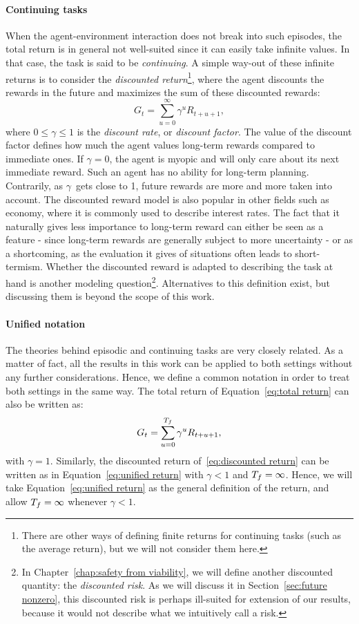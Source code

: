 				\paragraph{Continuing tasks} When the agent-environment interaction does not break into such episodes, the total return is in general not well-suited since it can easily take infinite values. In that case, the task is said to be\emph{ continuing}. A simple way-out of these infinite returns is to consider the\emph{ discounted return}\footnote{There are other ways of defining finite returns for continuing tasks (such as the average return), but we will not consider them here.}, where the agent discounts the rewards in the future and maximizes the sum of these discounted rewards:
				\begin{equation}
					G_t = \sum_{u=0}^\infty \gamma^u R_{t + u + 1}, \label{eq:discounted return}
				\end{equation}
				where $0 \leq \gamma \leq 1$ is the\emph{ discount rate}, or\emph{ discount factor}. The value of the discount factor defines how much the agent values long-term rewards compared to immediate ones. If $\gamma = 0$, the agent is myopic and will only care about its next immediate reward. Such an agent has no ability for long-term planning. Contrarily, as $\gamma$~gets close to 1, future rewards are more and more taken into account. The discounted reward model is also popular in other fields such as economy, where it is commonly used to describe interest rates. The fact that it naturally gives less importance to long-term reward can either be seen as a feature - since long-term rewards are generally subject to more uncertainty - or as a shortcoming, as the evaluation it gives of situations often leads to short-termism. Whether the discounted reward is adapted to describing the task at hand is another modeling question\footnote{In Chapter~\ref{chap:safety from viability}, we will define another discounted quantity: the\emph{ discounted risk}. As we will discuss it in Section~\ref{sec:future nonzero}, this discounted risk is perhaps ill-suited for extension of our results, because it would not describe what we intuitively call a risk.}. Alternatives to this definition exist, but discussing them is beyond the scope of this work.
				\paragraph{Unified notation} The theories behind episodic and continuing tasks are very closely related. As a matter of fact, all the results in this work can be applied to both settings without any further considerations. Hence, we define a common notation in order to treat both settings in the same way. The total return of Equation~\eqref{eq:total return} can also be written as:
			\begin{equation}
				G_t = \sum_{u=0}^{{T_f}} \gamma^u R_{t + u + 1}, \label{eq:unified return}
			\end{equation}
			with $\gamma = 1$. Similarly, the discounted return of~\eqref{eq:discounted return} can be written as in Equation~\eqref{eq:unified return} with $\gamma < 1$ and ${T_f} = \infty$. Hence, we will take Equation~\eqref{eq:unified return} as the general definition of the return, and allow ${T_f} = \infty$ whenever $\gamma < 1$.
